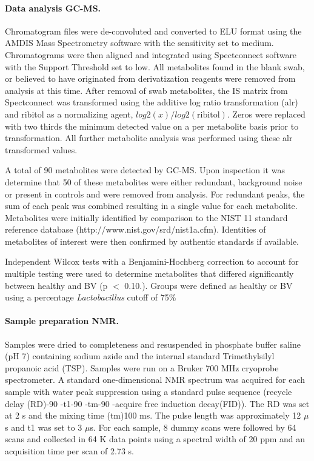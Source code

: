 \documentclass[10pt,letterpaper]{article}
\begin{document}
\paragraph{Data analysis GC-MS.} Chromatogram files were de-convoluted and converted to ELU format using the AMDIS Mass Spectrometry software \cite{stein:1999} with the sensitivity set to medium. Chromatograms were then aligned and integrated using Spectconnect \cite{stycz:2007} software with the Support Threshold set to low. All metabolites found in the blank swab, or believed to have originated from derivatization reagents were removed from analysis at this time. After removal of swab metabolites, the IS matrix from Spectconnect was transformed using the additive log ratio transformation (alr) and ribitol as a normalizing agent, $log2(x) / log2(\mathrm{ribitol})$. Zeros were replaced with two thirds the minimum detected value on a per metabolite basis prior to transformation. All further metabolite analysis was performed using these alr transformed values. 
	
A total of 90 metabolites were detected by GC-MS. Upon inspection it was determine that 50 of these metabolites were either redundant, background noise or present in controls and were removed from analysis. For redundant peaks, the sum of each peak was combined resulting in a single value for each metabolite. Metabolites were initially identified by comparison to the NIST 11 standard reference database (http://www.nist.gov/srd/nist1a.cfm). Identities of metabolites of interest were then confirmed by authentic standards if available. 

Independent Wilcox tests with a Benjamini-Hochberg correction to account for multiple testing were used to determine metabolites that differed significantly between healthy and BV (p $<$ 0.10.). Groups were defined as healthy or BV using a percentage \emph{Lactobacillus} cutoff of 75\%

\paragraph{Sample preparation NMR.} Samples were dried to completeness and resuspended in phosphate buffer saline (pH 7) containing sodium azide and the internal standard Trimethylsilyl propanoic acid (TSP). Samples were run on a Bruker 700 MHz cryoprobe spectrometer. A standard one-dimensional NMR spectrum was acquired for each sample with water peak suppression using a standard pulse sequence (recycle delay (RD)-90 -t1-90 -tm-90 -acquire free induction decay(FID)). The RD was set at 2 s and the mixing time (tm)100 ms. The pulse length was approximately 12   $\mu$s and t1 was set to 3  $\mu$s. For each sample, 8 dummy scans were followed by 64 scans and collected in 64 K data points using a spectral width of 20 ppm and an acquisition time per scan of 2.73 s.
\end{document}
